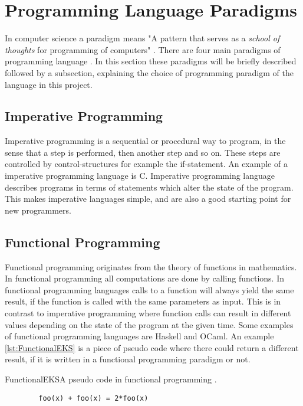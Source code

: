 \section{Programming Language Paradigms}
In computer science a paradigm means "A pattern that serves as a \textit{school of thoughts} for programming of computers" \citep{ProgrammingParadigms2}. 
There are four main paradigms of programming language \citep{ProgrammingParadigms}. In this section these paradigms will be briefly described followed by a subsection, explaining the choice of programming paradigm of the language in this project.

\subsection{Imperative Programming}
Imperative programming is a sequential or procedural way to program, in the sense that a step is performed, then another step and so on. These steps are controlled by control-structures for example the if-statement. An example of a imperative programming language is C. Imperative programming language describes programs in terms of statements which alter the state of the program. This makes imperative languages simple, and are also a good starting point for new programmers.


\subsection{Functional Programming}
Functional programming originates from the theory of functions in mathematics. In functional programming all computations are done by calling functions. In functional programming languages calls to a function will always yield the same result, if the function is called with the same parameters as input. This is in contrast to imperative programming where function calls can result in different values depending on the state of the program at the given time. Some examples of functional programming languages are Haskell and OCaml.
An example \ref{lst:FunctionalEKS} is a piece of pseudo code where there could return a different result, if it is written in a functional programming paradigm or not.

\begin{code}{FunctionalEKS}{A pseudo code in functional programming \citep{funcprog}.}
	\begin{lstlisting}
		foo(x) + foo(x) = 2*foo(x)
	\end{lstlisting}
\end{code}


